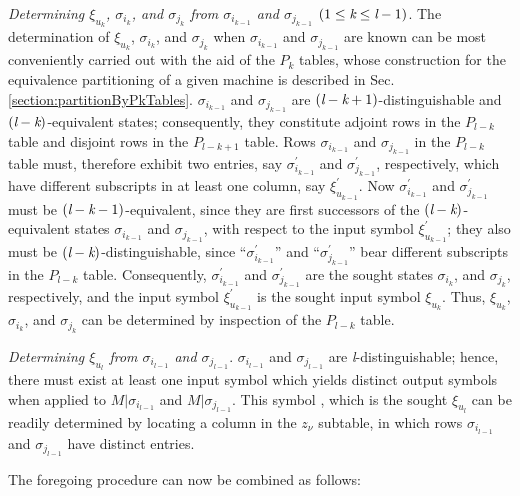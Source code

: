 \emph{Determining $\xi_{u_{k}}$, $\sigma_{i_{k}}$, and  $\sigma_{j_{k}}$ from $\sigma_{i_{k-1}}$ and $\sigma_{j_{k-1}}$ } $(1 \leq \emph{k} \leq \emph{l} - 1)$. The determination of $\xi_{u_{k}}$, $\sigma_{i_{k}}$, and  $\sigma_{j_{k}}$ when $\sigma_{i_{k-1}}$ and $\sigma_{j_{k-1}}$ are known can be most conveniently carried out with the aid of the $P_k$ tables, whose construction for the equivalence partitioning of a given machine is described in Sec. \ref{section:partitionByPkTables}. $\sigma_{i_{k-1}}$ and $\sigma_{j_{k-1}}$ are $(\emph{l} - \emph{k} + 1)$-distinguishable and $(\emph{l}-\emph{k})$-equivalent states; consequently, they constitute adjoint rows in the $P_{l-k}$ table and disjoint rows in the $P_{l-k+1}$ table. Rows $\sigma_{i_{k-1}}$ and $\sigma_{j_{k-1}}$ in the $P_{l-k}$ table must, therefore exhibit two entries, say $\sigma^{'}_{i_{k-1}}$ and $\sigma^{'}_{j_{k-1}}$, respectively, which have different subscripts in at least one column, say $\xi^{'}_{u_{k-1}}$. Now $\sigma^{'}_{i_{k-1}}$ and $\sigma^{'}_{j_{k-1}}$ must be $(\emph{l}-\emph{k}-1)$-equivalent, since they are first successors of the  $(\emph{l}-\emph{k})$-equivalent states $\sigma_{i_{k-1}}$ and $\sigma_{j_{k-1}}$, with respect to the input symbol $\xi^{'}_{u_{k-1}}$; they also must be $(\emph{l} - \emph{k})$-distinguishable, since ``$\sigma^{'}_{i_{k-1}}$'' and ``$\sigma^{'}_{j_{k-1}}$'' bear different subscripts in the $P_{l-k}$ table. Consequently, $\sigma^{'}_{i_{k-1}}$ and $\sigma^{'}_{j_{k-1}}$ are the sought states $\sigma_{i_{k}}$, and  $\sigma_{j_{k}}$, respectively, and the input symbol $\xi^{'}_{u_{k-1}}$ is the sought input symbol $\xi_{u_{k}}$. Thus, $\xi_{u_{k}}$, $\sigma_{i_{k}}$, and  $\sigma_{j_{k}}$ can be determined by inspection of the $P_{l-k}$ table.

\emph{Determining $ \xi_{u_{l}}$ from $\sigma_{i_{l-1}}$ and $\sigma_{j_{l-1} }$}. $\sigma_{i_{l-1}}$ and $\sigma_{j_{l-1}}$ are \emph{l}-distinguishable; hence, there must exist at least one input symbol which yields distinct output symbols when applied to $ M|\sigma_{i_{l-1}}$ and $ M|\sigma_{j_{l-1}}$. This symbol , which is the sought $\xi_{u_{l}}$ can be readily determined by locating a column in the $z_\nu$ subtable, in which rows $\sigma_{i_{l-1}}$ and $\sigma_{j_{l-1}}$ have distinct entries.

    The foregoing procedure can now be combined as follows:

